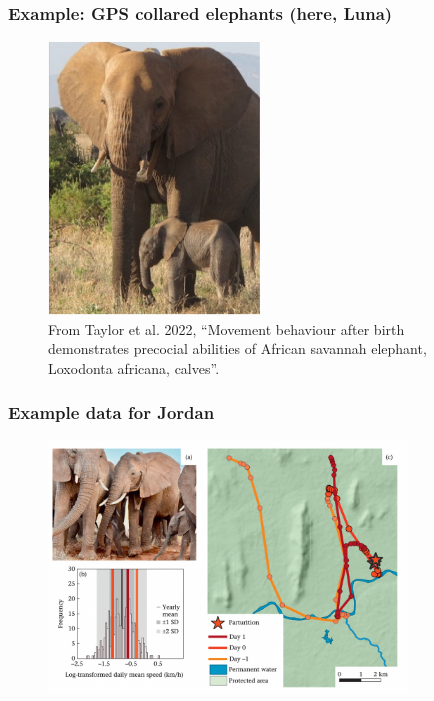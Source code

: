 \documentclass[main.tex]{subfiles}
\begin{document}
\begin{frame}
\frametitle{Example: GPS collared elephants (here, Luna)}

\begin{figure}
    \centering
    \includegraphics[width=0.5\textwidth]{figures/luna.jpg}
    \caption{From Taylor et al. 2022, ``Movement behaviour after birth demonstrates precocial abilities of African savannah elephant, Loxodonta africana, calves''.}
\end{figure}
    
\end{frame}

\begin{frame}
\frametitle{Example data for Jordan}

\begin{figure}
    \centering
    \includegraphics[width=0.85\textwidth]{figures/jordon_parturition.png}
\end{figure}
    
\end{frame}
\end{document}
